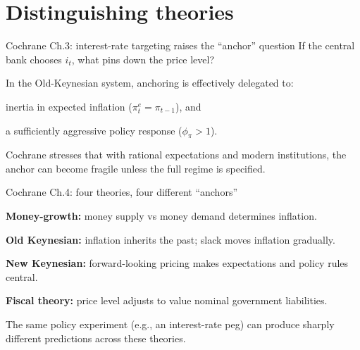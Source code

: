 \documentclass[aspectratio=169,xcolor=dvipsnames]{beamer}
\let\tempone\itemize
\let\temptwo\enditemize
\renewenvironment{itemize}{\tempone\addtolength{\itemsep}{\fill}}{\temptwo}
\begin{document}
\section[Theories]{Distinguishing theories}

\begin{frame}{Cochrane Ch.3: interest-rate targeting raises the ``anchor'' question}
\small
If the central bank chooses $i_t$, what pins down the price level?

\begin{itemize}
\item In the Old-Keynesian system, anchoring is effectively delegated to:
\begin{itemize}
\item inertia in expected inflation ($\pi_t^{e}=\pi_{t-1}$), and
\item a sufficiently aggressive policy response ($\phi_{\pi}>1$).
\end{itemize}
\item Cochrane stresses that with rational expectations and modern institutions, the anchor can become fragile unless the full regime is specified.
\end{itemize}
\end{frame}

\begin{frame}{Cochrane Ch.4: four theories, four different ``anchors''}
\small
\begin{itemize}
\item \textbf{Money-growth:} money supply vs money demand determines inflation.
\item \textbf{Old Keynesian:} inflation inherits the past; slack moves inflation gradually.
\item \textbf{New Keynesian:} forward-looking pricing makes expectations and policy rules central.
\item \textbf{Fiscal theory:} price level adjusts to value nominal government liabilities.
\end{itemize}

\vspace{0.3em}
\small
The same policy experiment (e.g., an interest-rate peg) can produce sharply different predictions across these theories.
\end{frame}
\end{document}
